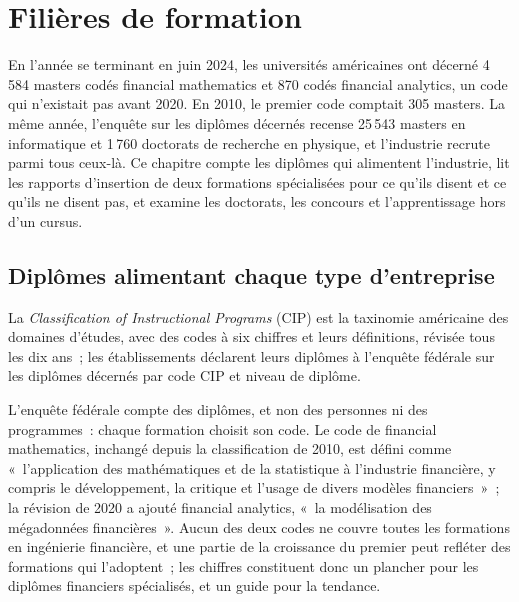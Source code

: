 \chapter{Filières de formation}\label{ch:in:education-pipelines}

En l'année se terminant en juin 2024, les universités américaines ont décerné 4\,584 masters codés financial mathematics et 870 codés
financial analytics, un code qui n'existait pas avant 2020. En 2010, le premier code comptait 305 masters. La
même année, l'enquête sur les diplômes décernés recense 25\,543 masters en informatique et 1\,760 doctorats de recherche en physique, et
l'industrie recrute parmi tous ceux-là. Ce chapitre compte les diplômes qui alimentent l'industrie, lit les rapports d'insertion de deux
formations spécialisées pour ce qu'ils disent et ce qu'ils ne disent pas, et examine les doctorats, les concours et
l'apprentissage hors d'un cursus.

\section{Diplômes alimentant chaque type d'entreprise}

\begin{definition}\label{def:in:education-pipelines:cip}
La \emph{Classification of Instructional Programs} (CIP) est la taxinomie américaine
des domaines d'études, avec des codes à six chiffres et leurs définitions, révisée tous les dix ans~; les établissements déclarent leurs
diplômes à l'enquête fédérale sur les diplômes décernés par code CIP et niveau de diplôme.
\end{definition}

L'enquête fédérale compte des diplômes, et non des personnes ni des programmes~: chaque formation choisit son code. Le code de
financial mathematics, inchangé depuis la classification de 2010, est défini comme «~l'application des mathématiques et de la
statistique à l'industrie financière, y compris le développement, la critique et l'usage de divers modèles financiers~»~; la
révision de 2020 a ajouté financial analytics, «~la modélisation des mégadonnées financières~». Aucun des deux codes ne couvre
toutes les formations en ingénierie financière, et une partie de la croissance du premier peut refléter des formations qui
l'adoptent~; les chiffres constituent donc un plancher pour les diplômes financiers spécialisés, et un guide pour la tendance.

